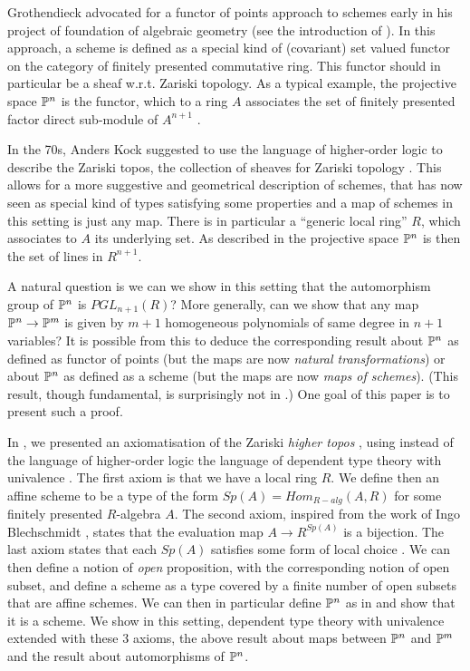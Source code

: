 Grothendieck advocated for a functor of points approach to schemes early in his
project of foundation of algebraic geometry (see the introduction of \cite{EGAIV1}).
In this approach, a scheme is defined as a special kind of (covariant) set valued functor
on the category of finitely presented commutative ring. This functor should in particular
be a sheaf w.r.t. Zariski topology. As a typical example, the projective space $\mathbb{P}^n$
is the functor, which to a ring $A$ associates the set of finitely presented factor direct
sub-module of $A^{n+1}$ \cite{Demazure,Eisenbud,Jantzen}.

In the 70s, Anders Kock suggested to use the language of higher-order logic \cite{Church40}
to describe the Zariski topos, the collection of sheaves for Zariski topology \cite{Kock74,kockreyes}.
This allows for
a more suggestive and geometrical description of schemes, that has now seen as special kind
of types satisfying some properties and a map of schemes in this setting is just any map.
There is in particular a ``generic
local ring'' $R$, which associates to $A$ its underlying set. As described in \cite{kockreyes}
the projective space $\mathbb{P}^n$ is then the set of lines in $R^{n+1}$.

A natural question is we can we show in this setting that the automorphism group of $\mathbb{P}^n$
is  $PGL_{n+1}(R)$?
More generally, can we show that any map $\mathbb{P}^n\rightarrow \mathbb{P}^m$ is given by $m+1$ homogeneous
polynomials of same degree in $n+1$ variables?
It is possible from this to deduce the corresponding result about $\mathbb{P}^n$ as defined
as functor of points (but the maps are now {\em natural transformations}) or about $\mathbb{P}^n$ as
defined as a scheme (but the maps are now {\em maps of schemes}).
(This result, though fundamental, is surprisingly not in \cite{Hartshorne}.)
One goal of this paper is to present such a proof.

In \cite{draft}, we presented an axiomatisation of the Zariski {\em higher topos} \cite{lurie-htt},
using instead of the language of higher-order logic the language of dependent type theory
with univalence \cite{hott}. The first axiom is that we have a local ring $R$. We define
then an affine scheme to be a type of the form $Sp(A) = Hom_{R-alg}(A,R)$ for some finitely presented
$R$-algebra $A$. The second axiom, inspired from the work of Ingo Blechschmidt \cite{ingo-thesis},
states that the evaluation map $A\rightarrow R^{Sp(A)}$ is a bijection. The last axiom states
that each $Sp(A)$ satisfies some form of local choice \cite{draft}. We can then define a notion
of {\em open} proposition, with the corresponding notion of open subset, and define a scheme as a type
covered by a finite number of open subsets that are affine schemes. We can then in particular define
$\mathbb{P}^n$ as in \cite{kockreyes} and show that it is a scheme.
We show in this setting, dependent type theory with univalence extended with these 3 axioms,
the above result about maps between $\mathbb{P}^n$ and $\mathbb{P}^m$ and the result about automorphisms of $\mathbb{P}^n$.

